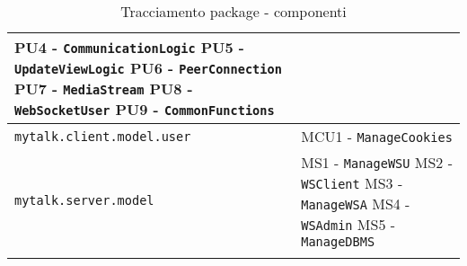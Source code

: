 {{\begin{longtable}{p{} p{}}
{PU4 - \texttt{CommunicationLogic}}\newline
{PU5 - \texttt{UpdateViewLogic}}\newline
{PU6 - \texttt{PeerConnection}}\newline
{PU7 - \texttt{MediaStream}}\newline
{PU8 - \texttt{WebSocketUser}}\newline
{PU9 - \texttt{CommonFunctions}}\\
\midrule
\texttt{mytalk.client.model.user}	&
{MCU1 - \texttt{ManageCookies}}\\
\midrule
\texttt{mytalk.server.model}	&
{MS1 - \texttt{ManageWSU}}\newline
{MS2 - \texttt{WSClient}}\newline
{MS3 - \texttt{ManageWSA}}\newline
{MS4 - \texttt{WSAdmin}}\newline
{MS5 - \texttt{ManageDBMS}}\\
\bottomrule
	\caption{Tracciamento package - componenti}
\end{longtable}
}
\newpage

}
